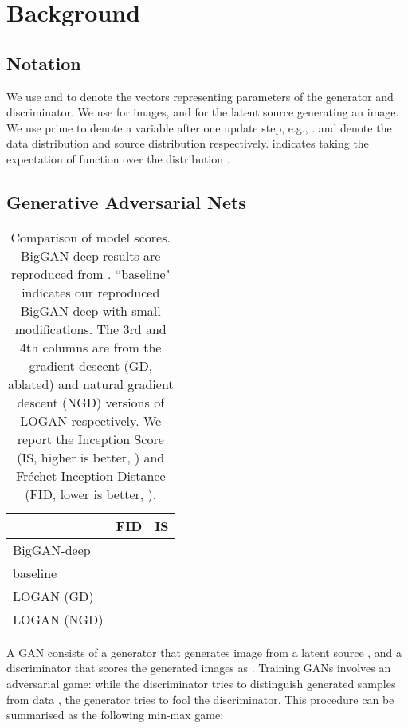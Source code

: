 \documentclass{article} \usepackage{iclr2020_conference,times}
\begin{document}
\section{Background}

\subsection{Notation}
We use  and  to denote the vectors representing parameters of the generator and discriminator. We use  for images, and  for the latent source generating an image. We use prime  to denote a variable after one update step, e.g., .  and  denote the data distribution and source distribution respectively.  indicates taking the expectation of function  over the distribution .

\subsection{Generative Adversarial Nets}

\begin{table}[tb]
\caption{Comparison of model scores. BigGAN-deep results are reproduced from \cite{brock2018large}. ``baseline" indicates our reproduced BigGAN-deep with small modifications. The 3rd and 4th columns are from the gradient descent (GD, ablated) and natural gradient descent (NGD) versions of LOGAN respectively. We report the Inception Score (IS, higher is better, \citealt{salimans2016improved}) and Fr{\'e}chet Inception Distance (FID, lower is better, \citealt{heusel2017gans}).}
\label{sample-table}
\begin{center}
\begin{tabular}{l|ll}
         & FID & IS \\
\hline
BigGAN-deep  &  &  \\
baseline &  &  \\
LOGAN (GD) &  &  \\
LOGAN (NGD) &  & 
\end{tabular}
\end{center}
\label{tab:scores}
\end{table}

A GAN consists of a generator that generates image  from a latent source , and a discriminator that scores the generated images as  \citep{goodfellow2014generative}. Training GANs involves an adversarial game: while the discriminator tries to distinguish generated samples  from data , the generator tries to fool the discriminator.
This procedure can be summarised as the following min-max game:
\end{document}
